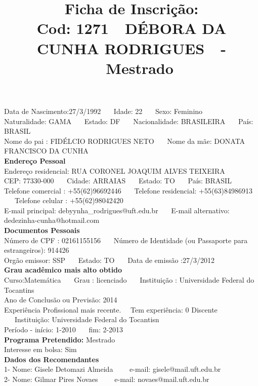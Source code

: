 \documentclass[11pt]{article}
\title{\vspace*{-4cm} Ficha de Inscrição: \\Cod: 1271\ \ DÉBORA DA CUNHA RODRIGUES\ \ - \ \ Mestrado 
 }
\date{}
\begin{document}
\maketitle
\vspace*{-1.5cm}
\noindent Data de Nascimento:27/3/1992
\ \ \ Idade: 22   \ \ \ Sexo: Feminino
\\
Naturalidade: GAMA  
\ \ \  Estado: DF
\ \ \  Nacionalidade: BRASILEIRA
\ \ \ País: BRASIL
\\        
Nome do pai : FIDÉLCIO RODRIGUES NETO
\ \ \ Nome da mãe: DONATA FRANCISCO DA CUNHA          
\\[0.2cm]                     
\textbf{Endereço Pessoal} 
\\ 
\noindent Endereço residencial: RUA CORONEL JOAQUIM ALVES TEIXEIRA
\\
        CEP: 77330-000 
\ \ \ Cidade: ARRAIAS 
\ \ \ Estado: TO 
\ \ \ País: BRASIL
\\		
		Telefone comercial : +55(62)96692446
\ \ \ Telefone residencial: +55(63)84986913
\ \ \ Telefone celular : +55(62)98042420
\\
E-mail principal: debyynha\_rodrigues@uft.edu.br
\ \ \ E-mail alternativo: dedezinha-cunha@hotmail.com 
\\[0.2cm] 
\textbf{Documentos Pessoais}
\\
\noindent Número de CPF : 02161155156
\ \ \ Número de Identidade (ou Passaporte para estrangeiros): 914426
\\
Orgão emissor: SSP
\ \ \ Estado: TO
\ \ \ Data de emissão :27/3/2012
\\[0.3cm]
\textbf{Grau acadêmico mais alto obtido}
\\	
Curso:Matemática
\ \ \ Grau : licenciado
\ \ \ Instituição : Universidade Federal do Tocantins
\\			
Ano de Conclusão ou Previsão: 2014
\\ 
Experiência Profissional mais recente. \ \  
Tem experiência: 0 Discente  
\ \ \ Instituição: Universidade Federal do Tocantisn
\\  
Período - início: 1-2010
\ \ \ fim: 2-2013
\\[0.2cm] 
\textbf{Programa Pretendido:} Mestrado\\
Interesse em bolsa: Sim
\\[0.3cm]		
\textbf{Dados dos Recomendantes} 
\\
1- Nome: Gisele Detomazi Almeida
\ \ \ \  e-mail: gisele@mail.uft.edu.br 
\\
2- Nome: Gilmar Pires Novaes
\ \ \ \ e-mail: novaes@mail.uft.edu.br
\end{document}
